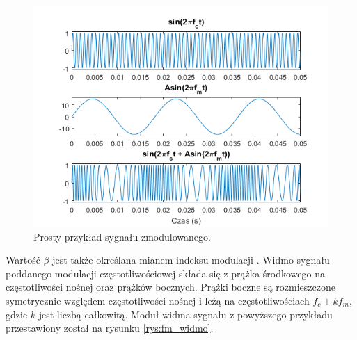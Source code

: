 \begin{figure}[H]
	\centering
	\includegraphics[width=12cm]{grafiki/fm_wykres1}
	\captionsetup{justification=centering}
	\caption{Prosty przykład sygnału zmodulowanego.}
	\label{rys:fm_wykres1}
\end{figure}

Wartość $\beta$ jest także określana mianem indeksu modulacji \cite{chowning}. Widmo sygnału poddanego modulacji częstotliwościowej składa się z prążka środkowego na częstotliwości nośnej oraz prążków bocznych. Prążki boczne są rozmieszczone symetrycznie względem częstotliwości nośnej i leżą na częstotliwościach $f_c \pm kf_m$, gdzie $k$ jest liczbą całkowitą. Moduł widma sygnału z powyższego przykładu przestawiony został na rysunku \ref{rys:fm_widmo}.

